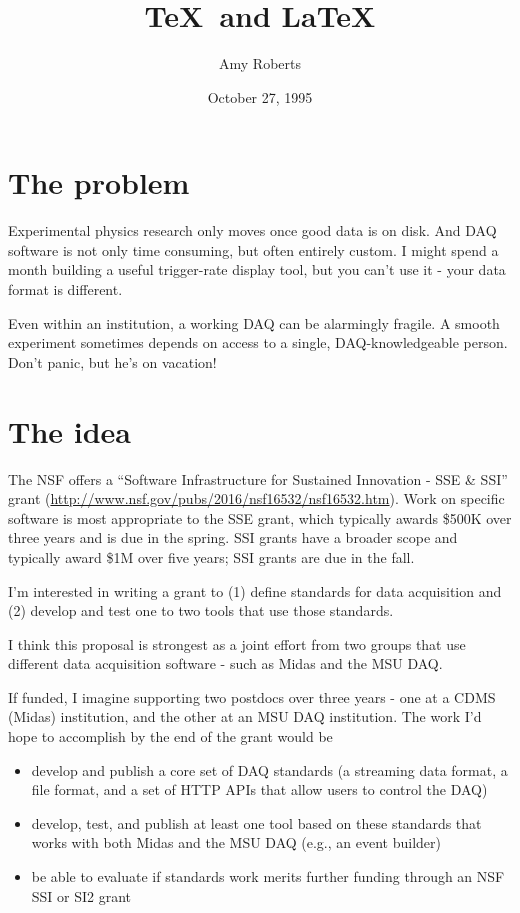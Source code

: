 \documentclass[]{report}   %
\begin{document}
\title{\TeX\ and \LaTeX}   %
\author{Amy Roberts}         %
\date{October 27, 1995}    %


\section*{The problem}     %

Experimental physics research only moves once good data is on disk.  And DAQ software is not only time consuming, but often entirely custom.  I might spend a month building a useful trigger-rate display tool, but you can't use it - your data format is different.  

Even within an institution, a working DAQ can be alarmingly fragile.  A smooth experiment sometimes depends on access to a single, DAQ-knowledgeable person.  Don't panic, but he's on vacation!  


\section*{The idea}     %
The NSF offers a ``Software Infrastructure for Sustained Innovation - SSE \& SSI'' grant
(\url{http://www.nsf.gov/pubs/2016/nsf16532/nsf16532.htm}).  Work on specific software is most appropriate to the SSE grant, which typically awards \$500K over three years and is due in the spring.  SSI grants have a broader scope and typically award \$1M over five years; SSI grants are due in the fall.

I'm interested in writing a grant to (1) define standards for data acquisition and (2) develop and test one to two tools that use those standards.  

I think this proposal is strongest as a joint effort from two groups that use different data acquisition software - such as Midas and the MSU DAQ.

If funded, I imagine supporting two postdocs over three years - one at a CDMS (Midas) institution, and the other at an MSU DAQ institution.  The work I'd hope to accomplish by the end of the grant would be
\begin{itemize}
 \item develop and publish a core set of DAQ standards (a streaming data format, a file format, and a set of HTTP APIs that allow users to control the DAQ)
 \item develop, test, and publish at least one tool based on these standards that works with both Midas and the MSU DAQ (e.g., an event builder) 
 \item be able to evaluate if standards work merits further funding through an NSF SSI or SI2 grant
\end{itemize}
\end{document}
